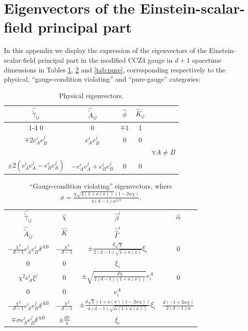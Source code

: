 \documentclass[reprint,aps,amsmath,amssymb,twoside,prd,showkeys,superscriptaddress,nofootinbib]{revtex4-2}
\begin{document}
\appendix



\section{Eigenvectors of the Einstein-scalar-field principal part}
\label{app:eigenvectors}

In this appendix we display the expression of the eigenvectors of the Einstein-scalar-field principal part in the modified CCZ4 gauge in $d+1$ spacetime dimensions in Tables \ref{tab:phys}, \ref{tab:viol} and \ref{tab:pure}, corresponding respectively to the physical, ``gauge-condition violating'' and ``pure-gauge'' categories:
\begin{table}[H]
    \centering
    \begin{tabular}{c|c|c|c c}
        $\hat{\tilde{\gamma}}_{ij}$ &  $\hat{\tilde{A}}_{ij}$ & $\hat{\phi}$ & $\hat{K}_{\phi}$  \\
        \cline{1-4}
        0 & 0 & $\mp1$ & 1 \\
        $\mp2e_A^ie_B^j$ & $e_A^ie_B^j$ & 0 & 0  \\
        \vspace{-0.3cm}
        & & & & $\forall A\neq B$ \\
            \vspace{-0.2cm}
        $\pm2(e_A^ie_A^j-e_B^ie_B^j)$ & $-e_A^ie_A^j+e_B^ie_B^j$ & 0 & 0 
    \end{tabular}
    \caption{Physical eigenvectors.}
    \label{tab:phys}
    \end{table}
    \begin{table}[H]
    \centering
    \begin{tabular}{c|c|c|c}
        $\hat{\tilde{\gamma}}_{ij}$ & $\hat{\chi}$ & $\hat{\beta}^i$ & $\hat{\alpha}$  \\
        $\hat{\tilde{A}}_{ij}$ & $\hat{K}$ & $\hat{\hat{\Gamma}}^i$  \\
        \hline
        $-\frac{\chi^2}{d-1}e_A^ie_B^i\delta^{AB}$ & $-\frac{\chi^2}{d-1}$ &  $\pm\frac{d\sqrt{\chi}}{2(d-1)\sqrt{1+a(x)}}\xi_i$ & 0 \\
        0 & 0 & $\xi_i$\\
        \hline
        $\chi^2e_A^i\xi^j$ & 0 & $\pm\sqrt{\frac{d\chi}{2(d-1)(1+a(x))}}e^A_i$ & 0\\
        0 & 0 & $e^A_i$ \\
        \hline
         $-\frac{\chi^2}{d-1}e_A^ie_B^j\delta^{AB}$ & $-\frac{\chi^2}{d-1}$ & $\pm\frac{d\sqrt{2}\left(1+a(x)(1-2\alpha\chi)\right)}{4(d-1)\sqrt{\alpha(1+a(x))}}\xi_i$ & $\frac{d(-1+2\alpha\chi)}{2(d-1)\alpha}$ \\
         $\mp\sigma e_A^ie_B^j\delta^{AB}$  & $\pm \tfrac{d\sigma}{\chi}$  & $\xi_i$ 
    \end{tabular}
    \caption{``Gauge-condition violating'' eigenvectors, where $\sigma=\tfrac{\chi\sqrt{2(1+a(x))}(1-2\alpha\chi)}{4(d-1)\alpha^{3/2}}$.}
    \label{tab:viol}
    \end{table}
\end{document}
